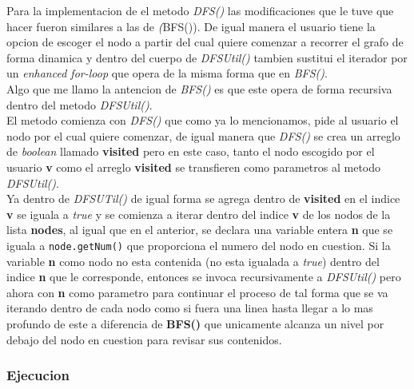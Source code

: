 \documentclass{article}
\begin{document}
			Para la implementacion de el metodo \emph{DFS()} las modificaciones que le tuve que hacer fueron similares a las de \emph(BFS()). De igual manera el usuario tiene la opcion de escoger el nodo a partir del cual quiere comenzar a recorrer el grafo de forma dinamica y dentro del cuerpo de \emph{DFSUtil()} tambien sustitui el iterador por un \textit{enhanced for-loop} que opera de la misma forma que en \emph{BFS()}.\\
			
			Algo que me llamo la antencion de \emph{BFS()} es que este opera de forma recursiva dentro del metodo \emph{DFSUtil()}.\\
			
			El metodo comienza con \emph{DFS()} que como ya lo mencionamos, pide al usuario el nodo por el cual quiere comenzar, de igual manera que \emph{DFS()} se crea un arreglo de \textit{boolean} llamado \textbf{visited} pero en este caso, tanto el nodo escogido por el usuario \textbf{v} como el arreglo \textbf{visited} se transfieren como parametros al metodo \emph{DFSUtil()}.\\
			
			Ya dentro de \emph{DFSUTil()} de igual forma se agrega dentro de \textbf{visited} en el indice \textbf{v} se iguala a \textit{true} y se comienza a iterar dentro del indice \textbf{v} de los nodos de la lista \textbf{nodes}, al igual que en el anterior, se declara una variable entera \textbf{n} que se iguala a \verb|node.getNum()| que proporciona el numero del nodo en cuestion. Si la variable \textbf{n} como nodo no esta contenida (no esta igualada a \textit{true}) dentro del indice \textbf{n} que le corresponde, entonces se invoca recursivamente a \emph{DFSUtil()} pero ahora con \textbf{n} como parametro para continuar el proceso de tal forma que se va iterando dentro de cada nodo como si fuera una linea hasta llegar a lo mas profundo de este a diferencia de \textbf{BFS()} que unicamente alcanza un nivel por debajo del nodo en cuestion para revisar sus contenidos.		
			
			\subsubsection{Ejecucion}
			
\end{document}
